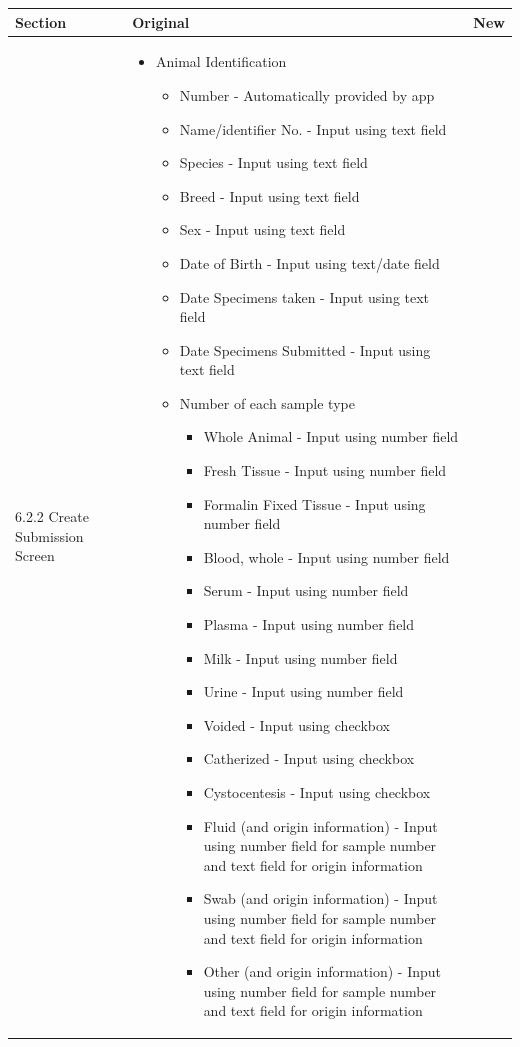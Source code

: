 \documentclass[onecolumn, draftclsnofoot, article, 10pt, compsoc]{IEEEtran}
\begin{document}
\clearpage
\begin{table}
\begin{tabularx}{\textwidth}{|>{\setlength\hsize{.5\hsize}\setlength\linewidth{\hsize}}X|>{\setlength\hsize{1.7\hsize}\setlength\linewidth{\hsize}}X|>{\setlength\hsize{.8\hsize}\setlength\linewidth{\hsize}}X|}
\hline
Section & Original & New \\
\hline

6.2.2 Create Submission Screen
&


\begin{itemize}


\item Animal Identification
    \begin{itemize}
    \item Number - Automatically provided by app
    \item Name/identifier No. - Input using text field
    \item Species - Input using text field
    \item Breed - Input using text field
    \item Sex - Input using text field
    \item Date of Birth - Input using text/date field
	\item Date Specimens taken - Input using text field
    \item Date Specimens Submitted - Input using text field
    
    \item Number of each sample type
    
      \begin{itemize}
      \item Whole Animal - Input using number field
      \item Fresh Tissue - Input using number field
      \item Formalin Fixed Tissue - Input using number field
      \item Blood, whole - Input using number field
      \item Serum - Input using number field
      \item Plasma - Input using number field
      \item Milk - Input using number field
      \item Urine - Input using number field
      \item Voided - Input using checkbox
      \item Catherized - Input using checkbox
      \item Cystocentesis - Input using checkbox
      \item Fluid (and origin information) - Input using number field for sample number and text field for origin information
      \item Swab (and origin information) - Input using number field for sample number and text field for origin information
      \item Other (and origin information) - Input using number field for sample number and text field for origin information
      \end{itemize}
      

\end{itemize}
\end{itemize}
\end{tabularx}
\end{table}
\end{document}
